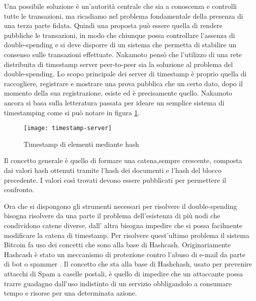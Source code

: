 	Una possibile soluzione è un'autorità centrale che sia a conoscenza e controlli tutte le transazioni, ma ricadiamo nel problema fondamentale della presenza di una terza parte fidata. Quindi una proposta può essere quella di rendere pubbliche le transazioni, in modo che chiunque possa controllare l'assenza di double-spending e si deve disporre di un sistema che permetta di stabilire un consenso sulle transazioni effettuate.
	Nakamoto pensò che l'utilizzo di una rete distribuita di timestamp server peer-to-peer sia la soluzione al problema del double-spending. 
	Lo scopo principale dei server di timestamp è proprio quella di raccogliere, registrare e mostrare una prova pubblica che un certo dato, dopo il momento della sua registrazione, esiste ed è precisamente quello.
	Nakamoto ancora si basa sulla letteratura passata per ideare un semplice sistema di timestamping come si può notare in figura \ref{fig:timestamp-server}.
	
		\begin{figure}
			\caption{Timestamp di elementi mediante hash}
			\centering
			\texttt{[image: timestamp-server]}
			\label{fig:timestamp-server}
		\end{figure}
		
		
	Il concetto generale è quello di formare una catena,sempre crescente, composta dai valori hash ottenuti tramite l'hash dei documenti e l'hash del blocco precedente. I valori così trovati devono essere pubblicati per permettere il confronto.
	
	Ora che si dispongono gli strumenti necessari per risolvere il double-spending bisogna risolvere da una parte il problema dell'esistenza di più nodi che condividono catene diverse, dall' altra bisogna impedire che si possa facilmente modificare la catena di timestamp.
	Per risolvere quest'ultimo problema il sistema Bitcoin fa uso dei concetti che sono alla base di Hashcash. Originariamente Hashcash è stato un meccanismo di protezione contro l'abuso di e-mail da parte di bot o spammer \cite{back2007hashcash}. Il concetto che sta alla base di Hashchash, usato per prevenire attacchi di Spam a caselle postali, è quello di impedire che un attaccante possa trarre guadagno dall'uso indistinto di un servizio obbligandolo a consumare tempo e risorse per una determinata azione.
	
